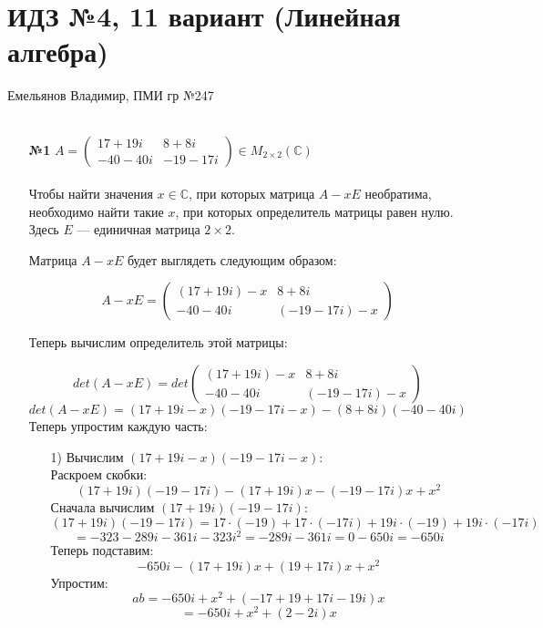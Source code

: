 \documentclass[a4paper]{article}
\newcommand{\CC}{\mathbb{C}}
\begin{document}
\section*{ИДЗ №4, 11 вариант (Линейная алгебра)}
 {\large Емельянов Владимир, ПМИ гр №247}\\\\
\begin{enumerate}
    \item[\textbf{№1}]$A = \left(\begin{array}{cc}
        17 + 19i & 8 + 8i \\
        -40 - 40i & -19 - 17i
        \end{array}\right) \in M_{2 \times 2}(\CC)$\\\\
    Чтобы найти значения $ x \in \mathbb{C} $, при которых матрица $ A - x E $ необратима, необходимо найти такие $ x $, при которых определитель матрицы равен нулю. Здесь $ E $ — единичная матрица $ 2 \times 2 $.

    Матрица $ A - x E $ будет выглядеть следующим образом:

    $$
    A - x E = \left(\begin{array}{cc}
    (17 + 19i) - x & 8 + 8i \\
    -40 - 40i & (-19 - 17i) - x
    \end{array}\right)
    $$
    
    Теперь вычислим определитель этой матрицы:

    $$
    det(A - x E) = det\left(\begin{array}{cc}
    (17 + 19i) - x & 8 + 8i \\
    -40 - 40i & (-19 - 17i) - x
    \end{array}\right)
    $$
    $$
    det(A - x E) = \left(17 + 19i - x\right)\left(-19 - 17i - x\right) - (8 + 8i)(-40 - 40i)
    $$
    Теперь упростим каждую часть:\\
    \begin{enumerate}
        \item[1)]Вычислим $ \left(17 + 19i - x\right)\left(-19 - 17i - x\right) $:\\
        Раскроем скобки:
        $$
        (17 + 19i)(-19 - 17i) - (17 + 19i)x - (-19 - 17i)x + x^2
        $$
        Сначала вычислим $(17 + 19i)(-19 - 17i)$:
        $$
        (17 + 19i)(-19 - 17i) = 17 \cdot (-19) + 17 \cdot (-17i) + 19i \cdot (-19) + 19i \cdot (-17i)
        $$
        $$
        = -323 - 289i - 361i - 323i^2= - 289i - 361i = 0 - 650i = -650i
        $$
        Теперь подставим:
        $$
        -650i - (17 + 19i)x + (19 + 17i)x + x^2
        $$
        Упростим:
        $$
        ab = -650i + x^2 + (-17 + 19 + 17i - 19i)x
        $$
        $$
        = -650i + x^2 + (2 - 2i)x
        $$


\end{enumerate}
\end{enumerate}
\end{document}
